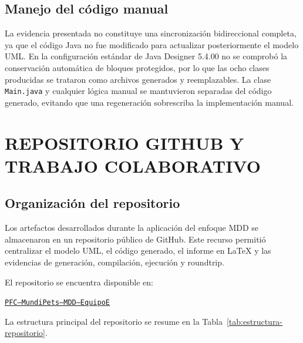 \documentclass[10pt,a4paper,openany]{report}
\begin{document}
	\section{Manejo del código manual}
	
	La evidencia presentada no constituye una sincronización bidireccional
	completa, ya que el código Java no fue modificado para actualizar
	posteriormente el modelo UML. En la configuración estándar de Java
	Designer 5.4.00 no se comprobó la conservación automática de bloques
	protegidos, por lo que las ocho clases producidas se trataron como
	archivos generados y reemplazables. La clase \texttt{Main.java} y
	cualquier lógica manual se mantuvieron separadas del código generado,
	evitando que una regeneración sobrescriba la implementación manual.
	
	
	
	
	\chapter{REPOSITORIO GITHUB Y TRABAJO COLABORATIVO}
	
	\section{Organización del repositorio}
	
	Los artefactos desarrollados durante la aplicación del enfoque MDD se
	almacenaron en un repositorio público de GitHub. Este recurso permitió
	centralizar el modelo UML, el código generado, el informe en LaTeX y las
	evidencias de generación, compilación, ejecución y roundtrip.
	
	El repositorio se encuentra disponible en:
	
	\begin{center}
		\href{
			https://github.com/MoralesGaryUteq/PFC-MundiPets-MDD-EquipoE
		}{
			\texttt{PFC--MundiPets--MDD--EquipoE}
		}
	\end{center}
	
	La estructura principal del repositorio se resume en la
	Tabla~\ref{tab:estructura-repositorio}.
	
\end{document}
